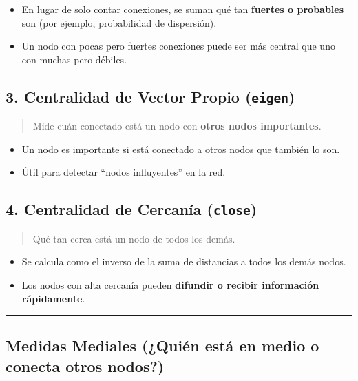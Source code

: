 \documentclass[
]{book}
\providecommand{\tightlist}{%
  \setlength{\itemsep}{0pt}\setlength{\parskip}{0pt}}
\begin{document}
\begin{itemize}
\tightlist
\item
  En lugar de solo contar conexiones, se suman qué tan \textbf{fuertes o probables} son (por ejemplo, probabilidad de dispersión).
\item
  Un nodo con pocas pero fuertes conexiones puede ser más central que uno con muchas pero débiles.
\end{itemize}

\subsection{\texorpdfstring{3. Centralidad de Vector Propio (\texttt{eigen})}{3. Centralidad de Vector Propio (eigen)}}\label{centralidad-de-vector-propio-eigen}

\begin{quote}
Mide cuán conectado está un nodo con \textbf{otros nodos importantes}.
\end{quote}

\begin{itemize}
\tightlist
\item
  Un nodo es importante si está conectado a otros nodos que también lo son.
\item
  Útil para detectar ``nodos influyentes'' en la red.
\end{itemize}

\subsection{\texorpdfstring{4. Centralidad de Cercanía (\texttt{close})}{4. Centralidad de Cercanía (close)}}\label{centralidad-de-cercanuxeda-close}

\begin{quote}
Qué tan cerca está un nodo de todos los demás.
\end{quote}

\begin{itemize}
\tightlist
\item
  Se calcula como el inverso de la suma de distancias a todos los demás nodos.
\item
  Los nodos con alta cercanía pueden \textbf{difundir o recibir información rápidamente}.
\end{itemize}

\begin{center}\rule{0.5\linewidth}{0.5pt}\end{center}

\subsection{Medidas Mediales (¿Quién está en medio o conecta otros nodos?)}\label{medidas-mediales-quiuxe9n-estuxe1-en-medio-o-conecta-otros-nodos}
\end{document}
